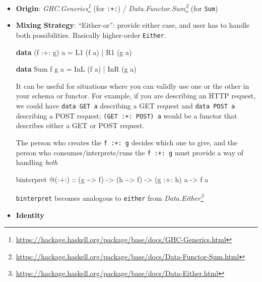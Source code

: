 \documentclass[]{article}
\newenvironment{Shaded}{}{}
\newcommand{\DataTypeTok}[1]{\textcolor[rgb]{0.56,0.13,0.00}{#1}}
\newcommand{\KeywordTok}[1]{\textcolor[rgb]{0.00,0.44,0.13}{\textbf{#1}}}
\newcommand{\NormalTok}[1]{#1}
\newcommand{\OperatorTok}[1]{\textcolor[rgb]{0.40,0.40,0.40}{#1}}
\newcommand{\OtherTok}[1]{\textcolor[rgb]{0.00,0.44,0.13}{#1}}
\renewcommand{\href}[2]{#2\footnote{\url{#1}}}
\begin{document}
\begin{itemize}
\item
  \textbf{Origin}:
  \emph{\href{https://hackage.haskell.org/package/base/docs/GHC-Generics.html}{GHC.Generics}}
  (for \texttt{:+:}) /
  \emph{\href{https://hackage.haskell.org/package/base/docs/Data-Functor-Sum.html}{Data.Functor.Sum}}
  (for \texttt{Sum})
\item
  \textbf{Mixing Strategy}: ``Either-or'': provide either case, and user has to
  handle both possibilities. Basically higher-order \texttt{Either}.

\begin{Shaded}
\begin{Highlighting}[]
\KeywordTok{data}\NormalTok{ (f }\OperatorTok{:+:}\NormalTok{ g) a}
    \OtherTok{=} \DataTypeTok{L1}\NormalTok{ (f a)}
    \OperatorTok{|} \DataTypeTok{R1}\NormalTok{ (g a)}

\KeywordTok{data} \DataTypeTok{Sum}\NormalTok{ f g a}
    \OtherTok{=} \DataTypeTok{InL}\NormalTok{ (f a)}
    \OperatorTok{|} \DataTypeTok{InR}\NormalTok{ (g a)}
\end{Highlighting}
\end{Shaded}

  It can be useful for situations where you can validly use one or the other in
  your schema or functor. For example, if you are describing an HTTP request, we
  could have \texttt{data\ GET\ a} describing a GET request and
  \texttt{data\ POST\ a} describing a POST request; \texttt{(GET\ :+:\ POST)\ a}
  would be a functor that describes either a GET or POST request.

  The person who creates the \texttt{f\ :+:\ g} decides which one to give, and
  the person who consumes/interprets/runs the \texttt{f\ :+:\ g} must provide a
  way of handling \emph{both}

\begin{Shaded}
\begin{Highlighting}[]
\NormalTok{binterpret }\OperatorTok{@}\NormalTok{(}\OperatorTok{:+:}\NormalTok{)}
\OtherTok{    ::}\NormalTok{ (g }\OperatorTok{\textasciitilde{}\textgreater{}}\NormalTok{ f)}
    \OtherTok{{-}\textgreater{}}\NormalTok{ (h }\OperatorTok{\textasciitilde{}\textgreater{}}\NormalTok{ f)}
    \OtherTok{{-}\textgreater{}}\NormalTok{ (g }\OperatorTok{:+:}\NormalTok{ h) a}
    \OtherTok{{-}\textgreater{}}\NormalTok{ f a}
\end{Highlighting}
\end{Shaded}

  \texttt{binterpret} becomes analogous to \texttt{either} from
  \emph{\href{https://hackage.haskell.org/package/base/docs/Data-Either.html}{Data.Either}}
\item
  \textbf{Identity}


\end{itemize}
\end{document}
